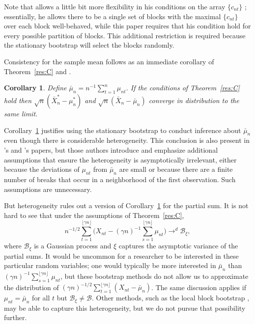 \documentclass[12pt]{article}
\newcommand\citepos[2][]{\citeauthor{#2}'s \citeyearpar[#1]{#2}}
\newtheorem{cor}[thm]{Corollary}
\theoremstyle{definition}
\begin{document}
Note that \citet{Jon:97} allows a little bit more flexibility in his
conditions on the array $\{c_{nt}\}$ \citep[see also][]{Dav:93};
essentially, he allows there to be a single set of blocks with the
maximal $\{c_{nt}\}$ over each block well-behaved, while this
paper requires that his condition hold for every possible partition of
blocks.  This additional restriction is required because the
stationary bootstrap will select the blocks randomly.

Consistency for the sample mean follows as an immediate corollary of
Theorem~\ref{res:C} and \citet[Theorem~2]{Jon:97}.

\begin{cor}\label{res:E} 
  Define $\bar{\mu}_n = n^{-1} \sum_{t=1}^n \mu_{nt}$.  If the
  conditions of Theorem~\ref{res:C} hold then $\sqrt{n}(\bar{X}_n^{*}
  - \mu_n^{*})$ and $\sqrt{n}(\bar{X}_n - \bar{\mu}_n)$ converge in
  distribution to the same limit.
\end{cor}

Corollary~\ref{res:E} justifies using the stationary bootstrap to
conduct inference about $\bar \mu_n$ even though there is considerable
heterogeneity.  This conclusion is also present in \citepos{GoW:02}
and \citepos{GoJ:03} papers, but those authors introduce and emphasize
additional assumptions that ensure the heterogeneity is asymptotically
irrelevant, either because the deviations of $\mu_{nt}$ from $\bar
\mu_n$ are small or because there are a finite number of breaks that
occur in a neighborhood of the first observation.  Such assumptions
are unnecessary.

But heterogeneity rules out a version of Corollary~\ref{res:E} for the
partial sum.  It is not hard to see that under the
assumptions of Theorem~\ref{res:C},
\begin{equation}
  n^{-1/2} \sum_{t=1}^{\lfloor \gamma n \rfloor} \Big(X_{nt}
  - (\gamma n)^{-1} \sum_{s=1}^{\lfloor \gamma n \rfloor}
  \mu_{nt}\Big) \to^d \mathcal{B}_{\xi},
\end{equation}
where $\mathcal{B}_{\xi}$ is a Gaussian process and $\xi$ captures the
asymptotic variance of the partial sums.  It would be uncommon for a
researcher to be interested in these particular random variables; one
would typically be more interested in $\bar \mu_n$ than $(\gamma
n)^{-1} \sum_{s=1}^{\lfloor \gamma n \rfloor} \mu_{nt}$, but these
bootstrap methods do not allow us to approximate the distribution of
$(\gamma n)^{-1/2} \sum_{t=1}^{\lfloor \gamma n \rfloor} (X_{nt} -
\bar \mu_n)$.  The same discussion applies if $\mu_{nt} = \bar{\mu}_n$
for all $t$ but $\mathcal{B}_{\xi} \neq \mathcal{B}$.  Other methods,
such as the local block bootstrap \citep{PaP:02,DPP:03}, may be able to
capture this heterogeneity, but we do not pursue that possibility
further.
\end{document}
